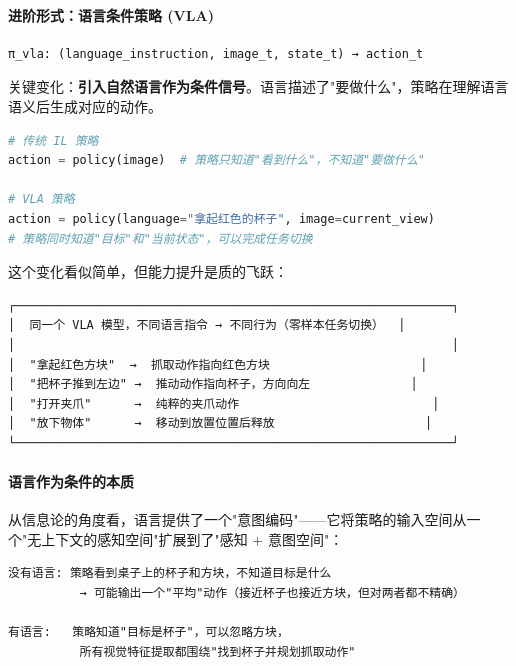 \documentclass[UTF8,a4paper,11pt]{ctexart}
\begin{document}
\paragraph{进阶形式：语言条件策略 (VLA)}


\begin{lstlisting}[language=text]
π_vla: (language_instruction, image_t, state_t) → action_t
\end{lstlisting}

关键变化：\textbf{引入自然语言作为条件信号}。语言描述了"要做什么"，策略在理解语言语义后生成对应的动作。

\begin{lstlisting}[language=python]
# 传统 IL 策略
action = policy(image)  # 策略只知道"看到什么"，不知道"要做什么"

# VLA 策略
action = policy(language="拿起红色的杯子", image=current_view)
# 策略同时知道"目标"和"当前状态"，可以完成任务切换
\end{lstlisting}

这个变化看似简单，但能力提升是质的飞跃：

\begin{lstlisting}[language=text]
┌─────────────────────────────────────────────────────────────┐
│  同一个 VLA 模型，不同语言指令 → 不同行为（零样本任务切换）  │
│                                                             │
│  "拿起红色方块"  →  抓取动作指向红色方块                     │
│  "把杯子推到左边" →  推动动作指向杯子，方向向左              │
│  "打开夹爪"      →  纯粹的夹爪动作                           │
│  "放下物体"      →  移动到放置位置后释放                     │
└─────────────────────────────────────────────────────────────┘
\end{lstlisting}

\paragraph{语言作为条件的本质}


从信息论的角度看，语言提供了一个"意图编码"——它将策略的输入空间从一个"无上下文的感知空间"扩展到了"感知 + 意图空间"：

\begin{lstlisting}[language=text]
没有语言: 策略看到桌子上的杯子和方块，不知道目标是什么
          → 可能输出一个"平均"动作（接近杯子也接近方块，但对两者都不精确）

有语言:   策略知道"目标是杯子"，可以忽略方块，
          所有视觉特征提取都围绕"找到杯子并规划抓取动作"
\end{lstlisting}
\end{document}
